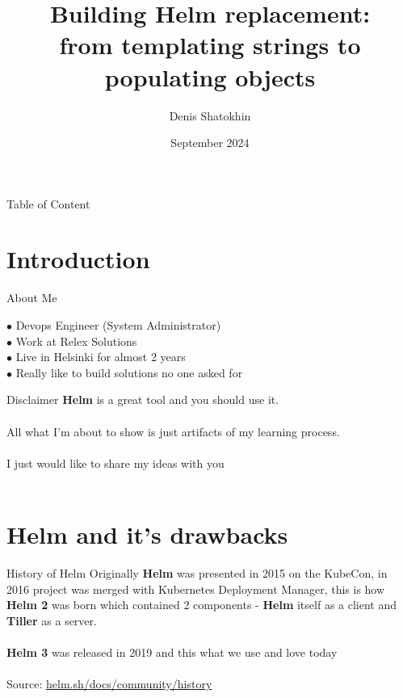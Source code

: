 \documentclass[11pt, aspectratio=169]{beamer}
\title[Building Helm replacement]{Building Helm replacement:\\from templating strings to populating objects}
\author{Denis Shatokhin}
\date{September 2024}
\begin{document}
\maketitle

\begin{frame}{ Table of Content}
	\tableofcontents
\end{frame}

\section{Introduction}

\begin{frame}{ About Me}
	\begin{description}
		\item [$\bullet$ Devops Engineer (System Administrator)]
		\item [$\bullet$ Work at Relex Solutions]
		\item [$\bullet$ Live in Helsinki for almost 2 years]
		\item [$\bullet$ Really like to build solutions no one asked for]
	\end{description}
\end{frame}

\begin{frame}{ Disclaimer}
	\textbf{Helm} is a great tool and you should use it.\\~\\
	All what I'm about to show is just artifacts of my learning process.\\~\\
	I just would like to share my ideas with you\\~\\

	\centerline{{\Huge {}}}
\end{frame}

\section{Helm and it's drawbacks}

\begin{frame}{ History of Helm}
	Originally \textbf{Helm} was presented in 2015 on the KubeCon,
	in 2016 project was merged with Kubernetes Deployment Manager,
	this is how \textbf{Helm 2} was born which contained 2 components -
	\textbf{Helm} itself as a client and \textbf{Tiller} as a server.\\~\\
	\textbf{Helm 3} was released in 2019 and this what we use and love today\\~\\
	Source: \href{https://helm.sh/docs/community/history}{helm.sh/docs/community/history}\\~\\

	\centerline{{\Huge {}}}
\end{frame}
\end{document}
